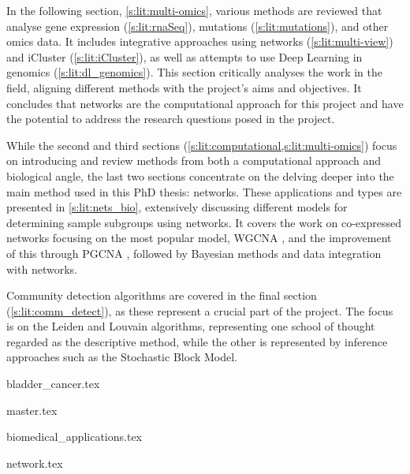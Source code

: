 In the following section, \ref{s:lit:multi-omics}, various methods are reviewed that analyse gene expression (\cref{s:lit:rnaSeq}), mutations (\cref{s:lit:mutations}), and other omics data. It includes integrative approaches using networks (\cref{s:lit:multi-view}) and iCluster (\cref{s:lit:iCluster}), as well as attempts to use Deep Learning in genomics (\cref{s:lit:dl_genomics}). This section critically analyses the work in the field, aligning different methods with the project's aims and objectives. It concludes that networks are the computational approach for this project and have the potential to address the research questions posed in the project.

While the second and third sections  (\cref{s:lit:computational,s:lit:multi-omics}) focus on introducing and review methods from both a computational approach and biological angle, the last two sections concentrate on the delving deeper into the main method used in this PhD thesis: networks. These applications and types are presented in \cref{s:lit:nets_bio}, extensively discussing different models for determining sample subgroups using networks. It covers the work on co-expressed networks focusing on the most popular model, WGCNA \cite{Langfelder2008-sn}, and the improvement of this through PGCNA \cite{Care2019-ij}, followed by Bayesian methods and data integration with networks.

Community detection algorithms are covered in the final section (\cref{s:lit:comm_detect}), as these represent a crucial part of the project. The focus is on the Leiden and Louvain algorithms, representing one school of thought regarded as the descriptive method, while the other is represented by inference approaches such as the Stochastic Block Model.



{bladder_cancer.tex}

\pagebreak

{master.tex}

\newpage

{biomedical_applications.tex}


\pagebreak

{network.tex}



